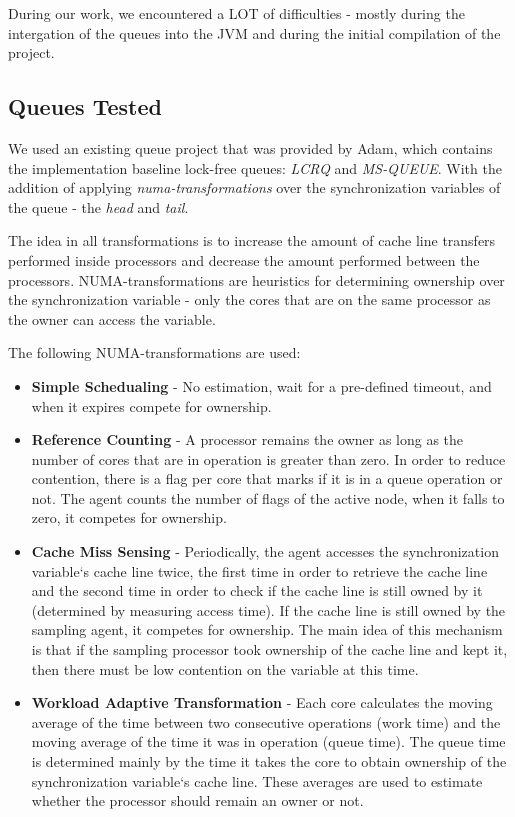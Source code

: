 \documentclass{article}
\begin{document}
 During our work, we encountered a LOT of difficulties - mostly during the intergation of the queues into the JVM and during the initial compilation of the project.

 \subsection{Queues Tested}

 We used an existing queue project that was provided by Adam, which contains the implementation baseline lock-free queues: \textit{LCRQ\cite{lcrq}} and \textit{MS-QUEUE}\cite{msqueue}. With the addition of applying \textit{numa-transformations} over the synchronization variables of the queue - the \textit{head} and \textit{tail}.

 The idea in all transformations is to increase the amount of cache line transfers performed inside processors and decrease the amount performed between the processors.
 NUMA-transformations are heuristics for determining ownership over the synchronization variable - only the cores that are on the same processor as the owner can access the variable.

 The following NUMA-transformations are used: 

 \begin{itemize}
   \item \textbf{Simple Schedualing} - No estimation, wait for a pre-defined timeout, and when it expires compete for ownership.
   \item \textbf{Reference Counting} - A processor remains the owner as long as the number of cores that are in operation is greater than zero. In order to reduce contention, there is a flag per core
	 that marks if it is in a queue operation or not. The agent counts the number of flags
	 of the active node, when it falls to zero, it competes for ownership.
   \item \textbf{Cache Miss Sensing} - Periodically, the agent accesses the synchronization variable`s
	   cache line twice, the first time in order to retrieve the cache line and the second time
	   in order to check if the cache line is still owned by it (determined by measuring access
	   time). If the cache line is still owned by the sampling agent, it competes for ownership.
	   The main idea of this mechanism is that if the sampling processor took ownership of
	   the cache line and kept it, then there must be low contention on the variable at this
	   time.
   \item \textbf{Workload Adaptive Transformation} - Each core calculates
	   the moving average of the time between two consecutive operations (work time) and the
	   moving average of the time it was in operation (queue time). The queue time is determined
	   mainly by the time it takes the core to obtain ownership of the synchronization variable`s
	   cache line. These averages are used to estimate whether the processor should remain an
	   owner or not.
 \end{itemize}
\end{document}
